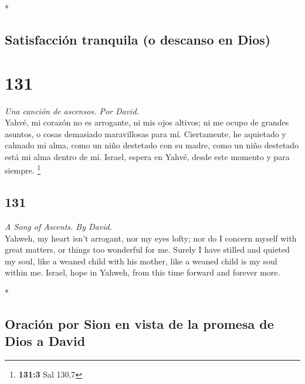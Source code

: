 \begin{paracol}{2}
\begin{otherlanguage}{english}
\end{otherlanguage}

\switchcolumn[0]*

\hypertarget{satisfacciuxf3n-tranquila-o-descanso-en-dios}{%
\subsection{Satisfacción tranquila (o descanso en
Dios)}\label{satisfacciuxf3n-tranquila-o-descanso-en-dios}}

\hypertarget{section-260}{%
\section{131}\label{section-260}}

\emph{Una canción de ascensos. Por David.}\\
 Yahvé, mi corazón no es arrogante, ni mis ojos altivos;
ni me ocupo de grandes asuntos, o cosas demasiado maravillosas para mí.
 Ciertamente, he aquietado y calmado mi alma, como un niño
destetado con su madre, como un niño destetado está mi alma dentro de
mí.  Israel, espera en Yahvé, desde este momento y para
siempre. \footnote{\textbf{131:3} Sal 130,7}

\switchcolumn
\begin{otherlanguage}{english}

\hypertarget{section-261}{%
\section{131}\label{section-261}}

\emph{A Song of Ascents. By David.}\\
 Yahweh, my heart isn't arrogant, nor my eyes lofty; nor
do I concern myself with great matters, or things too wonderful for me.
 Surely I have stilled and quieted my soul, like a weaned
child with his mother, like a weaned child is my soul within me.
 Israel, hope in Yahweh, from this time forward and
forever more.

\end{otherlanguage}

\switchcolumn[0]*

\hypertarget{oraciuxf3n-por-sion-en-vista-de-la-promesa-de-dios-a-david}{%
\subsection{Oración por Sion en vista de la promesa de Dios a
David}\label{oraciuxf3n-por-sion-en-vista-de-la-promesa-de-dios-a-david}}


\end{paracol}
